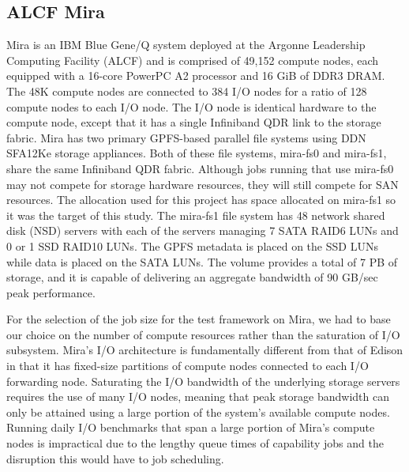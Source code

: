 \subsection{ALCF Mira} \label{sec:platforms/mira}

 Mira is an IBM Blue Gene/Q system deployed at the Argonne Leadership Computing Facility (ALCF) and is comprised of 49,152 compute nodes, each equipped with a 16-core PowerPC A2 processor and 16 GiB of DDR3 DRAM. The 48K 
compute nodes are connected to 384 I/O nodes for a ratio of 128 compute nodes
to each I/O node. The I/O node is identical hardware to the compute node,
except that it has a single Infiniband QDR link to the storage fabric.
Mira has two primary GPFS-based parallel file systems using DDN SFA12Ke storage appliances.
Both of these file systems, mira-fs0 and mira-fs1, share the same
Infiniband QDR fabric. Although jobs running that use mira-fs0 may not compete
for storage hardware resources, they will still compete for SAN resources.
The allocation used for this project has space allocated on mira-fs1 so it 
was the target of this study.
The mira-fs1 file system has 48 network shared disk (NSD) servers with each of the
servers managing 7 SATA RAID6 LUNs and 0 or 1 SSD RAID10 LUNs. The GPFS metadata
is placed on the SSD LUNs while data is placed on the SATA LUNs. The volume provides a total of 7 PB of storage, and it is capable of delivering an aggregate bandwidth of 90 GB/sec peak performance.


For the selection of the job size for the test framework on Mira, we had to
base our choice on the number of compute resources rather than the saturation of
I/O subsystem.
Mira's I/O architecture is fundamentally different from that of Edison in that it has fixed-size partitions of compute nodes connected to each I/O forwarding node.
Saturating the I/O bandwidth of the underlying storage servers requires the
use of many I/O nodes, meaning that peak storage bandwidth can only be
attained using a large portion of the system's available compute nodes.
Running daily I/O benchmarks that span a large portion of Mira's compute
nodes is impractical due to the lengthy queue times of capability jobs and
the disruption this would have to job scheduling.

